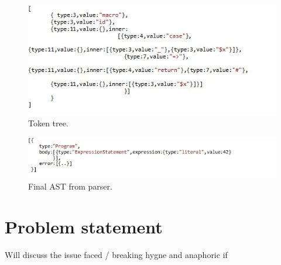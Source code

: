\begin{figure}[htb]
\centering
\includegraphics[width=1.0\textwidth]{images/readeroutput.jpg}
\caption{Token tree.} 
\label{fig:readeroutput}
\end{figure}

\begin{figure}[htb]
\centering
\includegraphics[width=1.0\textwidth]{images/AST.jpg}
\caption{Final AST from parser.} 
\label{fig:AST}
\end{figure}

\section{Problem statement}

Will discuss the issue faced / breaking hygne and anaphoric if